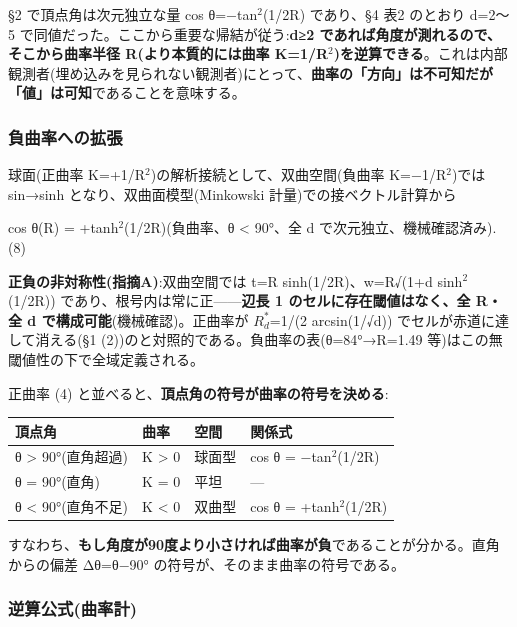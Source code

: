 \documentclass[
]{ltjsarticle}
\newcounter{none} %
\begin{document}
§2 で頂点角は次元独立な量 cos θ=−tan\(^{2}\)(1/2R) であり、§4 表2
のとおり d=2〜5 で同値だった。ここから重要な帰結が従う:\textbf{d≥2
であれば角度が測れるので、そこから曲率半径 R(より本質的には曲率
K=1/R\(^{2}\))を逆算できる}。これは内部観測者(埋め込みを見られない観測者)にとって、\textbf{曲率の「方向」は不可知だが「値」は可知}であることを意味する。

\subsubsection{負曲率への拡張}\label{ux8ca0ux66f2ux7387ux3078ux306eux62e1ux5f35}

球面(正曲率 K=+1/R\(^{2}\))の解析接続として、双曲空間(負曲率
K=−1/R\(^{2}\))では sin→sinh となり、双曲面模型(Minkowski
計量)での接ベクトル計算から

cos θ(R) = +tanh\(^{2}\)(1/2R)(負曲率、θ \textless{} 90°、全 d
で次元独立、機械確認済み). (8)

\textbf{正負の非対称性(指摘A)}:双曲空間では t=R sinh(1/2R)、w=R√(1+d
sinh\(^{2}\)(1/2R)) であり、根号内は常に正------\textbf{辺長 1
のセルに存在閾値はなく、全 R・全 d で構成可能}(機械確認)。正曲率が
\(R^{*}_{d}\)=1/(2 arcsin(1/√d)) でセルが赤道に達して消える(§1
(2))のと対照的である。負曲率の表(θ=84°→R=1.49
等)はこの無閾値性の下で全域定義される。

正曲率 (4) と並べると、\textbf{頂点角の符号が曲率の符号を決める}:

{\def\LTcaptype{none} %
\begin{longtable}[]{@{}llll@{}}
\toprule\noalign{}
頂点角 & 曲率 & 空間 & 関係式 \\
\midrule\noalign{}
\endhead
\bottomrule\noalign{}
\endlastfoot
θ \textgreater{} 90°(直角超過) & K \textgreater{} 0 & 球面型 & cos θ =
−tan\(^{2}\)(1/2R) \\
θ = 90°(直角) & K = 0 & 平坦 & --- \\
θ \textless{} 90°(直角不足) & K \textless{} 0 & 双曲型 & cos θ =
+tanh\(^{2}\)(1/2R) \\
\end{longtable}
}

すなわち、\textbf{もし角度が90度より小さければ曲率が負}であることが分かる。直角からの偏差
Δθ=θ−90° の符号が、そのまま曲率の符号である。

\subsubsection{逆算公式(曲率計)}\label{ux9006ux7b97ux516cux5f0fux66f2ux7387ux8a08}
\end{document}
